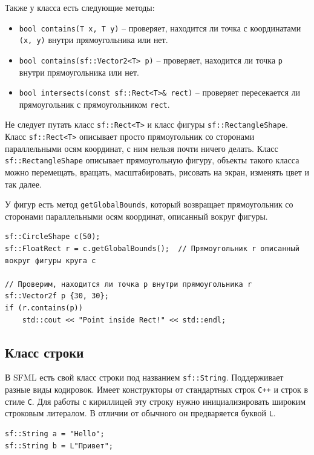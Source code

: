 \documentclass{article}
\begin{document}
Также у класса есть следующие методы:
\begin{itemize}
\item \texttt{bool contains(T x, T y)} -- проверяет, находится ли точка с координатами \texttt{(x, y)} внутри прямоугольника или нет.
\item \texttt{bool contains(sf::Vector2<T> p)}  -- проверяет, находится ли точка \texttt{p} внутри прямоугольника или нет.
\item \texttt{bool intersects(const sf::Rect<T>\& rect)} -- проверяет пересекается ли прямоугольник с прямоугольником \texttt{rect}.
\end{itemize}

Не следует путать класс \texttt{sf::Rect<T>} и класс фигуры \texttt{sf::RectangleShape}.
Класс \texttt{sf::Rect<T>} описывает просто прямоугольник со сторонами параллельными осям координат, с ним нельзя почти ничего делать. Класс \texttt{sf::RectangleShape} описывает прямоугольную фигуру, объекты такого класса можно перемещать, вращать, масштабировать, рисовать на экран, изменять цвет и так далее.

У фигур есть метод \texttt{getGlobalBounds}, который возвращает прямоугольник со сторонами параллельными осям координат, описанный вокруг фигуры.
\begin{lstlisting}
sf::CircleShape c(50);
sf::FloatRect r = c.getGlobalBounds();  // Прямоугольник r описанный вокруг фигуры круга c

// Проверим, находится ли точка p внутри прямоугольника r
sf::Vector2f p {30, 30};
if (r.contains(p))
    std::cout << "Point inside Rect!" << std::endl;
\end{lstlisting}

\subsection*{Класс строки}
В SFML есть свой класс строки под названием \texttt{sf::String}. Поддерживает разные виды кодировок. Имеет конструкторы от стандартных строк \texttt{C++} и строк в стиле \texttt{C}. Для работы с кириллицей эту строку нужно инициализировать широким строковым литералом. В отличии от обычного он предваряется буквой \texttt{L}.
\begin{lstlisting}
sf::String a = "Hello";
sf::String b = L"Привет";
\end{lstlisting}
\end{document}
